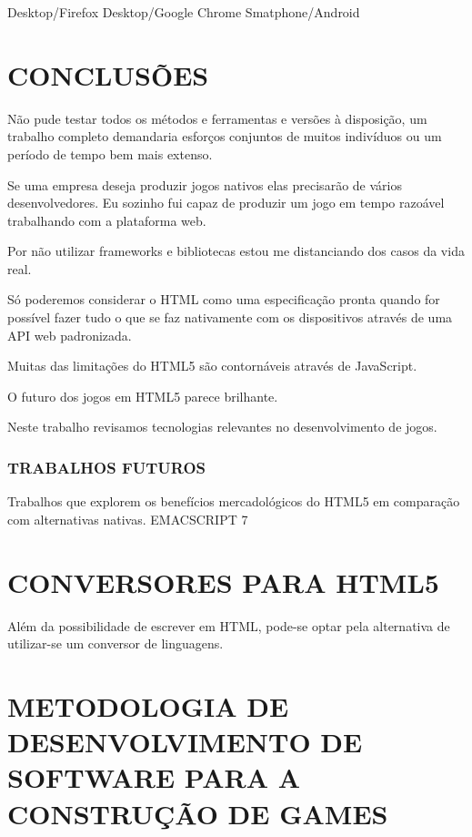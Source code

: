 \documentclass[
12pt,
a4paper,
portuges,
draft
]{report}
\begin{document}
Desktop/Firefox
Desktop/Google Chrome
Smatphone/Android

\chapter{CONCLUSÕES}
\thispagestyle{myheadings}

Não pude testar todos os métodos e ferramentas e versões à
disposição, um trabalho completo demandaria esforços conjuntos de
muitos indivíduos ou um período de tempo bem mais extenso. 

Se uma empresa deseja produzir jogos nativos elas precisarão de vários
desenvolvedores. Eu sozinho fui capaz de produzir um jogo em tempo
razoável trabalhando com a plataforma web.

Por não utilizar frameworks e bibliotecas estou me distanciando
dos casos da vida real.

Só poderemos considerar o HTML como uma especificação pronta quando for possível fazer tudo o que se faz nativamente com os dispositivos através de uma API web padronizada.

Muitas das limitações do HTML5 são contornáveis através de JavaScript.

O futuro dos jogos em HTML5 parece brilhante.


Neste trabalho revisamos tecnologias relevantes no desenvolvimento de jogos.


\subsection{TRABALHOS FUTUROS}

Trabalhos que explorem os benefícios mercadológicos do HTML5 em comparação com alternativas nativas.
EMACSCRIPT 7


\clearpage
\markboth{}{}
\printbibliography[heading=bibintoc,title={REFERÊNCIAS BIBLIOGRÁFICAS}]
\markboth{}{}
\appendix


\chapter{CONVERSORES PARA HTML5}
Além da possibilidade de escrever em HTML, pode-se optar pela
alternativa de utilizar-se um conversor de linguagens.

\chapter{METODOLOGIA DE DESENVOLVIMENTO DE SOFTWARE PARA A CONSTRUÇÃO DE GAMES}
\end{document}
